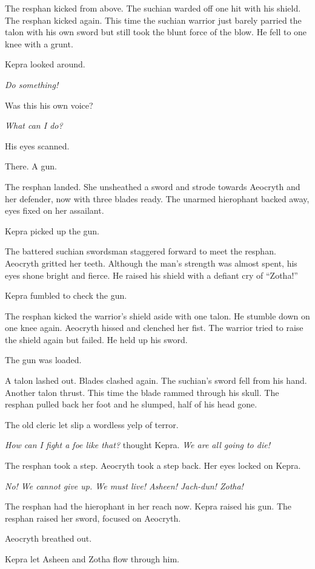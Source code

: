 \documentclass
  [a4paper,
   12pt,
   oneside
  ]%
  {article}
\begin{document}
The resphan kicked from above. 
The suchian warded off one hit with his shield. 
The resphan kicked again. 
This time the suchian warrior just barely parried the talon with his own sword but still took the blunt force of the blow. 
He fell to one knee with a grunt. 

Kepra looked around. 

\emph{Do something!}

Was this his own voice?

\emph{What can I do?}

His eyes scanned.

There. A gun. 

The resphan landed. She unsheathed a sword and strode towards Aeocryth and her defender, now with three blades ready. The unarmed hierophant backed away, eyes fixed on her assailant. 

Kepra picked up the gun. 

The battered suchian swordsman staggered forward to meet the resphan. 
Aeocryth gritted her teeth. 
Although the man's strength was almost spent, his eyes shone bright and fierce.
He raised his shield with a defiant cry of ``Zotha!''

Kepra fumbled to check the gun. 

The resphan kicked the warrior's shield aside with one talon. 
He stumble down on one knee again. 
Aeocryth hissed and clenched her fist.
The warrior tried to raise the shield again but failed. 
He held up his sword. 

The gun was loaded.

A talon lashed out. Blades clashed again. The suchian’s sword fell from his hand. Another talon thrust. This time the blade rammed through his skull. 
The resphan pulled back her foot and he slumped, half of his head gone.

The old cleric let slip a wordless yelp of terror.

\emph{How can I fight a foe like that?} thought Kepra. \emph{We are all going to die!}

The resphan took a step. Aeocryth took a step back. Her eyes locked on Kepra.

\emph{No! We cannot give up. We must live! Asheen! Jach-dun! Zotha!}

The resphan had the hierophant in her reach now.
Kepra raised his gun. 
The resphan raised her sword, focused on Aeocryth. 

Aeocryth breathed out. 

Kepra let Asheen and Zotha flow through him. 
\end{document}
